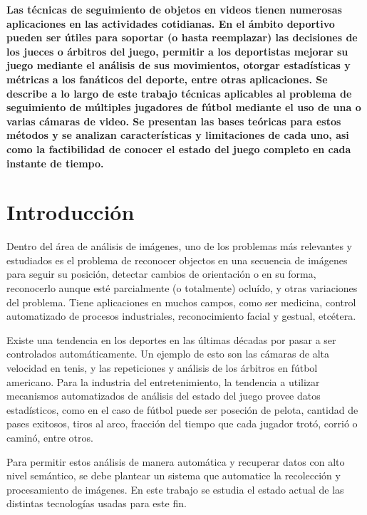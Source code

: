 \documentclass[a4paper,10pt]{article}
\title{}
\date{20 de Septiembre de 2013}
\author{Civile, Juan Pablo \and Crespo, Álvaro \and Ordano, Esteban }
\begin{document}
\pagestyle{fancy}
\maketitle
\thispagestyle{fancy}

\begin{customabstract}
\textbf{
Las técnicas de seguimiento de objetos en videos tienen numerosas aplicaciones
en las actividades cotidianas. En el ámbito deportivo pueden ser útiles para
soportar (o hasta reemplazar) las decisiones de los jueces o árbitros del
juego, permitir a los deportistas mejorar su juego mediante el análisis de sus
movimientos, otorgar estadísticas y métricas a los fanáticos del deporte, entre
otras aplicaciones. Se describe a lo largo de este trabajo técnicas aplicables
al problema de seguimiento de múltiples jugadores de fútbol mediante el uso de
una o varias cámaras de video. Se presentan las bases teóricas para estos
métodos y se analizan características y limitaciones de cada uno, asi como la
factibilidad de conocer el estado del juego completo en cada instante de tiempo.
} \end{customabstract}

\part*{Introducción}

Dentro del área de análisis de imágenes, uno de los problemas más relevantes y
estudiados es el problema de reconocer objectos en una secuencia de
imágenes para seguir su posición, detectar cambios de orientación o en su
forma, reconocerlo aunque esté parcialmente (o totalmente) ocluído, y otras
variaciones del problema. Tiene aplicaciones en muchos campos, como ser
medicina, control automatizado de procesos industriales, reconocimiento facial
y gestual, etcétera.

Existe una tendencia en los deportes en las últimas décadas por pasar a ser
controlados automáticamente. Un ejemplo de esto son las cámaras de alta
velocidad en tenis, y las repeticiones y análisis de los árbitros en fútbol
americano. Para la industria del entretenimiento, la tendencia a utilizar
mecanismos automatizados de análisis del estado del juego provee datos
estadísticos, como en el caso de fútbol puede ser poseción de pelota, cantidad
de pases exitosos, tiros al arco, fracción del tiempo que cada jugador trotó,
corrió o caminó, entre otros.

Para permitir estos análisis de manera automática y recuperar datos con alto
nivel semántico, se debe plantear un sistema que automatice la recolección
y procesamiento de imágenes. En este trabajo se estudia el estado
actual de las distintas tecnologías usadas para este fin.
\end{document}
